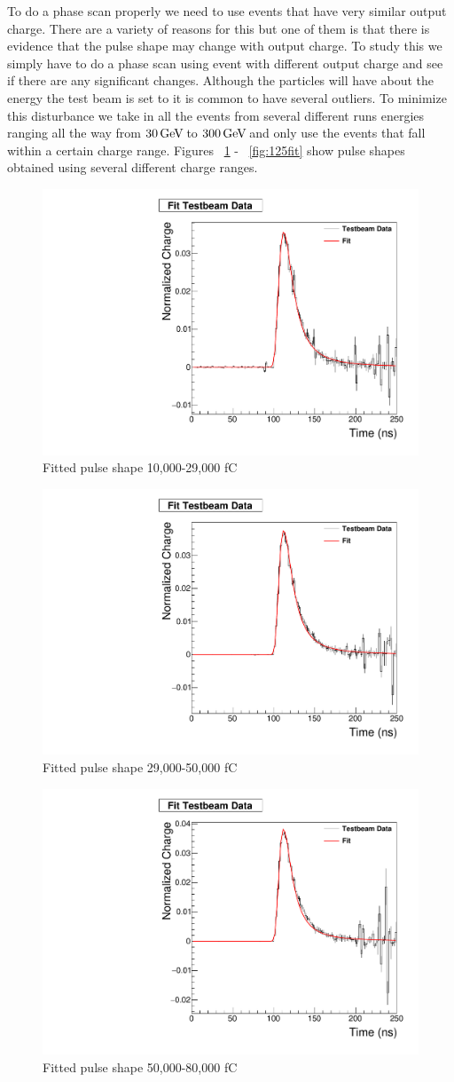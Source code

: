 To do a phase scan properly we need to use events that have very similar output charge. There are a variety of reasons for this but one of them is that there is evidence that the pulse shape may change with output charge. To study this we simply have to do a phase scan using event with different output charge and see if there are any significant changes. Although the particles will have about the energy the test beam is set to it is common to have several outliers. To minimize this disturbance we take in all the events from several different runs energies ranging all the way from $30 {\,\text{Ge\hspace{-.08em}V\hspace{-0.16em}}}$ to $300 {\,\text{Ge\hspace{-.08em}V\hspace{-0.16em}}}$ and only use the events that fall within a certain charge range. Figures ~\ref{fig:10fit} - ~\ref{fig:125fit} show pulse shapes obtained using several different charge ranges.

\begin{figure}
\centering
\includegraphics[width=0.5\linewidth]{Figures/FittedPlot.pdf}
\caption{Fitted pulse shape 10,000-29,000 fC}
\label{fig:10fit}
\end{figure}

\begin{figure}
\centering
\includegraphics[width=0.5\linewidth]{Figures/29FittedPlot.pdf}
\caption{Fitted pulse shape 29,000-50,000 fC}
\label{fig:29fit}
\end{figure}

\begin{figure}
\centering
\includegraphics[width=0.5\linewidth]{Figures/50FittedPlot.pdf}
\caption{Fitted pulse shape 50,000-80,000 fC}
\label{fig:50fit}
\end{figure}

